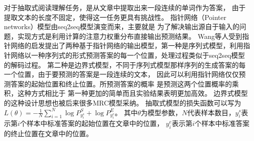 %

对于抽取式阅读理解任务，是从文章中提取出来一段连续的单词作为答案，
由于提取文本的长度不固定，使得这一任务更具有挑战性。
指针网络（Pointer networks）模型由seq2seq模型演变而来，主要就是
为了解决输出源自于输入的问题，实现方式是利用计算的注意力权重分布直接输出预测结果。
Wang等人受到指针网络的启发提出了两种基于指针网络的输出模型，第一种是序列式模型，利用指针网络以一种序列式的形式预测答案的每一个位置，处理过程类似于seq2seq模型的解码过程。
第二种是边界式模型，不同于序列式模型那样序列的生成答案的每一个位置，由于要预测的答案是一段连续的文本，
因此可以利用指针网络仅仅预测答案的起始位置和终止位置。所预测答案的概率
是预测这两个位置概率的乘积，这种方式相比于
第一种更加的简单而且实验结果表明更加高效。
边界式模型的这种设计思想也被后来很多MRC模型采纳。
抽取式模型的损失函数可以写为
$L(\theta)=-\displaystyle\frac{1}{N}\sum_{i=1}^{N}\log P_{y_i^s}^S+\log P_{y_i^e}^E$。
其中$\theta$为模型参数，$N$代表样本数目，$y_i^s$表示第$i$个样本中标准答案的起始位置在文章中的位置，
$y_i^e$表示第$i$个样本中标准答案的终止位置在文章中的位置。


